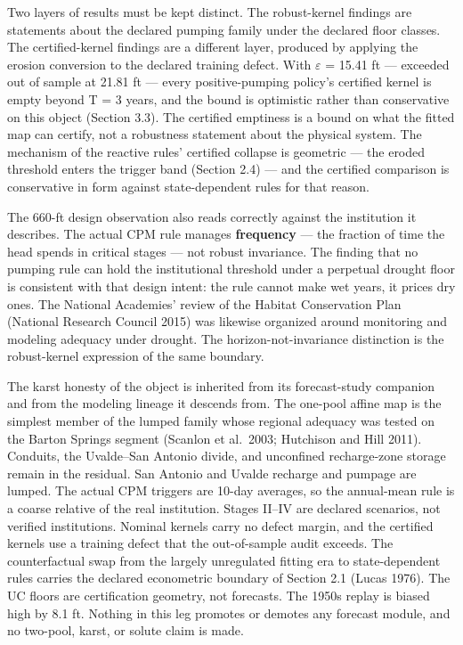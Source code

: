 \documentclass[11pt]{article}
\begin{document}
Two layers of results must be kept distinct. The robust-kernel findings
are statements about the declared pumping family under the declared
floor classes. The certified-kernel findings are a different layer,
produced by applying the erosion conversion to the declared training
defect. With \ensuremath{\varepsilon} = 15.41 ft --- exceeded out of sample at 21.81 ft ---
every positive-pumping policy's certified kernel is empty beyond T = 3
years, and the bound is optimistic rather than conservative on this
object (Section 3.3). The certified emptiness is a bound on what the
fitted map can certify, not a robustness statement about the physical
system. The mechanism of the reactive rules' certified collapse is
geometric --- the eroded threshold enters the trigger band (Section 2.4)
--- and the certified comparison is conservative in form against
state-dependent rules for that reason.

The 660-ft design observation also reads correctly against the
institution it describes. The actual CPM rule manages \textbf{frequency}
--- the fraction of time the head spends in critical stages --- not
robust invariance. The finding that no pumping rule can hold the
institutional threshold under a perpetual drought floor is consistent
with that design intent: the rule cannot make wet years, it prices dry
ones. The National Academies' review of the Habitat Conservation Plan
(National Research Council 2015) was likewise organized around
monitoring and modeling adequacy under drought. The
horizon-not-invariance distinction is the robust-kernel expression of
the same boundary.

The karst honesty of the object is inherited from its forecast-study
companion and from the modeling lineage it descends from. The one-pool
affine map is the simplest member of the lumped family whose regional
adequacy was tested on the Barton Springs segment (Scanlon et al.~2003;
Hutchison and Hill 2011). Conduits, the Uvalde--San Antonio divide, and
unconfined recharge-zone storage remain in the residual. San Antonio and
Uvalde recharge and pumpage are lumped. The actual CPM triggers are
10-day averages, so the annual-mean rule is a coarse relative of the
real institution. Stages II--IV are declared scenarios, not verified
institutions. Nominal kernels carry no defect margin, and the certified
kernels use a training defect that the out-of-sample audit exceeds. The
counterfactual swap from the largely unregulated fitting era to
state-dependent rules carries the declared econometric boundary of
Section 2.1 (Lucas 1976). The UC floors are certification geometry, not
forecasts. The 1950s replay is biased high by 8.1 ft. Nothing in this
leg promotes or demotes any forecast module, and no two-pool, karst, or
solute claim is made.
\end{document}
